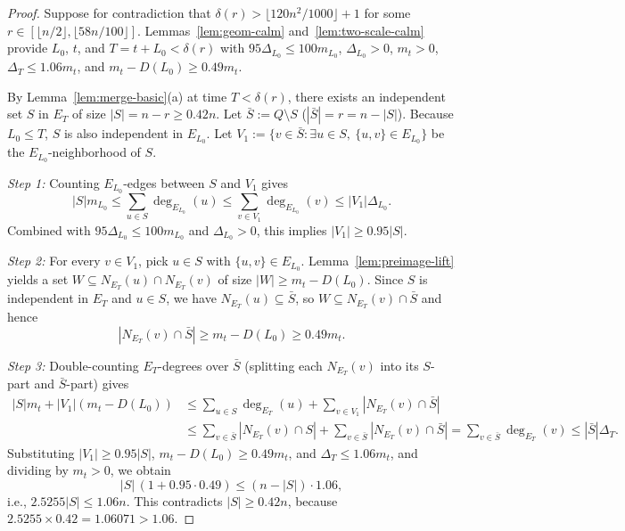 \documentclass[11pt]{article}
\theoremstyle{definition}
\theoremstyle{remark}
\begin{document}
\begin{proof}
Suppose for contradiction that $\delta(r) > \lfloor 120 n^2 / 1000 \rfloor + 1$ for some $r \in [\lfloor n/2 \rfloor, \lfloor 58 n / 100 \rfloor]$. Lemmas~\ref{lem:geom-calm} and~\ref{lem:two-scale-calm} provide $L_0$, $t$, and $T = t + L_0 < \delta(r)$ with $95 \Delta_{L_0} \le 100 m_{L_0}$, $\Delta_{L_0} > 0$, $m_t > 0$, $\Delta_T \le 1.06 m_t$, and $m_t - D(L_0) \ge 0.49 m_t$.

By Lemma~\ref{lem:merge-basic}(a) at time $T < \delta(r)$, there exists an independent set $S$ in $E_T$ of size $|S| = n - r \ge 0.42 n$. Let $\bar{S} := Q \setminus S$ ($|\bar{S}| = r = n - |S|$). Because $L_0 \le T$, $S$ is also independent in $E_{L_0}$. Let $V_1 := \{v \in \bar{S} : \exists u \in S,\ \{u, v\} \in E_{L_0}\}$ be the $E_{L_0}$-neighborhood of $S$.

\emph{Step 1:} Counting $E_{L_0}$-edges between $S$ and $V_1$ gives
\[
  |S| m_{L_0} \le \sum_{u \in S} \deg_{E_{L_0}}(u) \le \sum_{v \in V_1} \deg_{E_{L_0}}(v) \le |V_1| \Delta_{L_0}.
\]
Combined with $95 \Delta_{L_0} \le 100 m_{L_0}$ and $\Delta_{L_0} > 0$, this implies $|V_1| \ge 0.95 |S|$.

\emph{Step 2:} For every $v \in V_1$, pick $u \in S$ with $\{u, v\} \in E_{L_0}$. Lemma~\ref{lem:preimage-lift} yields a set $W \subseteq N_{E_T}(u) \cap N_{E_T}(v)$ of size $|W| \ge m_t - D(L_0)$. Since $S$ is independent in $E_T$ and $u \in S$, we have $N_{E_T}(u) \subseteq \bar{S}$, so $W \subseteq N_{E_T}(v) \cap \bar{S}$ and hence
\[
  |N_{E_T}(v) \cap \bar{S}| \ge m_t - D(L_0) \ge 0.49 m_t.
\]

\emph{Step 3:} Double-counting $E_T$-degrees over $\bar{S}$ (splitting each $N_{E_T}(v)$ into its $S$-part and $\bar{S}$-part) gives
\begin{align*}
  |S| m_t + |V_1| (m_t - D(L_0))
  &\le \sum_{u \in S} \deg_{E_T}(u) + \sum_{v \in V_1} |N_{E_T}(v) \cap \bar{S}| \\
  &\le \sum_{v \in \bar{S}} |N_{E_T}(v) \cap S| + \sum_{v \in \bar{S}} |N_{E_T}(v) \cap \bar{S}|
   = \sum_{v \in \bar{S}} \deg_{E_T}(v) \le |\bar{S}| \Delta_T.
\end{align*}
Substituting $|V_1| \ge 0.95 |S|$, $m_t - D(L_0) \ge 0.49 m_t$, and $\Delta_T \le 1.06 m_t$, and dividing by $m_t > 0$, we obtain
\[
  |S|\,(1 + 0.95 \cdot 0.49) \le (n - |S|) \cdot 1.06,
\]
i.e., $2.5255 |S| \le 1.06 n$. This contradicts $|S| \ge 0.42 n$, because $2.5255 \times 0.42 = 1.06071 > 1.06$.
\end{proof}
\end{document}
